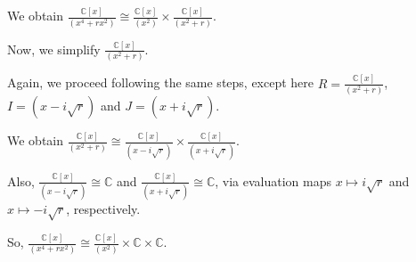 \documentclass[12pt,a4paper]{article}
\theoremstyle{definition}
\begin{document}
\begin{flushleft}
We obtain $\frac{\mathbb{C}[x]}{(x^4 + rx^2)} \cong \frac{\mathbb{C}[x]}{(x^2)} \times \frac{\mathbb{C}[x]}{(x^2 + r)}$.

\medskip

Now, we simplify $\frac{\mathbb{C}[x]}{(x^2 + r)}$.

Again, we proceed following the same steps, except here $R = \frac{\mathbb{C}[x]}{(x^2 + r)}$, $I = (x-i\sqrt{r})$ and $J = (x+i\sqrt{r})$.

We obtain $\frac{\mathbb{C}[x]}{(x^2 + r)} \cong \frac{\mathbb{C}[x]}{(x-i\sqrt{r})} \times \frac{\mathbb{C}[x]}{(x+i\sqrt{r})}$.

Also, $\frac{\mathbb{C}[x]}{(x-i\sqrt{r})} \cong \mathbb{C}$ and $\frac{\mathbb{C}[x]}{(x+i\sqrt{r})} \cong \mathbb{C} $, via evaluation maps $x \mapsto i\sqrt{r}$ and $x \mapsto -i\sqrt{r}$, respectively.

\medskip

So, $\frac{\mathbb{C}[x]}{(x^4 + rx^2)} \cong \frac{\mathbb{C}[x]}{(x^2)} \times \mathbb{C} \times \mathbb{C}$.

\end{flushleft}
\end{document}
